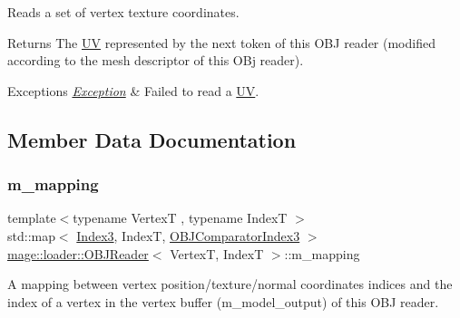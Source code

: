 Reads a set of vertex texture coordinates.

\begin{DoxyReturn}{Returns}
The {\ttfamily \hyperlink{structmage_1_1_u_v}{UV}} represented by the next token of this O\+BJ reader (modified according to the mesh descriptor of this O\+Bj reader). 
\end{DoxyReturn}

\begin{DoxyExceptions}{Exceptions}
{\em \hyperlink{classmage_1_1_exception}{Exception}} & Failed to read a {\ttfamily \hyperlink{structmage_1_1_u_v}{UV}}. \\
\hline
\end{DoxyExceptions}


\subsection{Member Data Documentation}
\hypertarget{classmage_1_1loader_1_1_o_b_j_reader_a4538c827571318be8563ba44974791ee}{}\label{classmage_1_1loader_1_1_o_b_j_reader_a4538c827571318be8563ba44974791ee} 
\subsubsection{\texorpdfstring{m\+\_\+mapping}{m\_mapping}}
{\footnotesize\ttfamily template$<$typename VertexT , typename IndexT $>$ \\
std\+::map$<$ \hyperlink{classmage_1_1loader_1_1_o_b_j_reader_af9aab131e88c5a3a0f29b156c4c97096}{Index3}, IndexT, \hyperlink{structmage_1_1loader_1_1_o_b_j_reader_1_1_o_b_j_comparator_index3}{O\+B\+J\+Comparator\+Index3} $>$ \hyperlink{classmage_1_1loader_1_1_o_b_j_reader}{mage\+::loader\+::\+O\+B\+J\+Reader}$<$ VertexT, IndexT $>$\+::m\+\_\+mapping\hspace{0.3cm}{\ttfamily [private]}}

A mapping between vertex position/texture/normal coordinates\textquotesingle{} indices and the index of a vertex in the vertex buffer ({\ttfamily m\+\_\+model\+\_\+output}) of this O\+BJ reader. \hypertarget{classmage_1_1loader_1_1_o_b_j_reader_ab0da26407762a9322c0d65b8960cb0f9}{}\label{classmage_1_1loader_1_1_o_b_j_reader_ab0da26407762a9322c0d65b8960cb0f9} 
